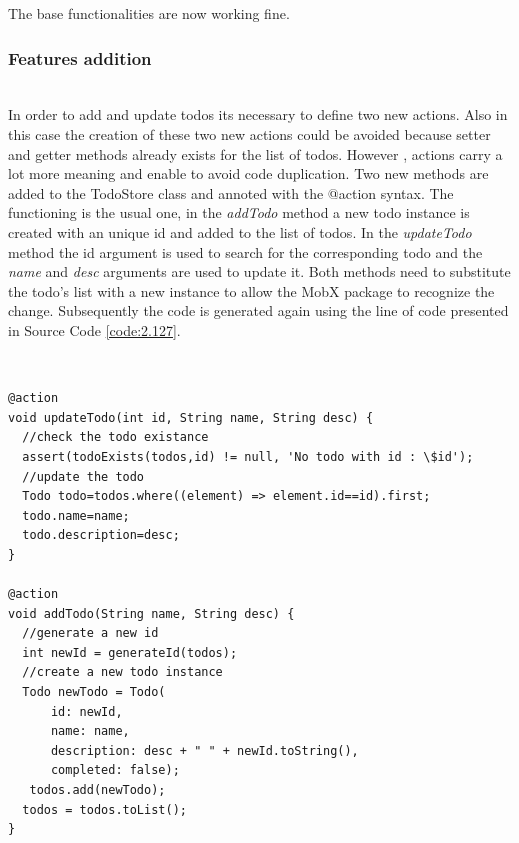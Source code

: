 The base functionalities are now working fine.
\subsubsection{Features addition} \mbox{}\\ \label{par:todo_app_inherited_widget_introduction}In order to add and update todos its necessary to define two new actions. Also in this case the creation of these two new actions could be avoided because setter and getter methods already exists for the list of todos. However , actions carry a lot more meaning and enable to avoid code duplication. Two new methods are added to the TodoStore class and annoted with the @action syntax. The functioning is the usual one, in the \textit{addTodo} method a new todo instance is created with an unique id and added to the list of todos. In the \textit{updateTodo} method the id argument is used to search for the corresponding todo and the \textit{name} and \textit{desc} arguments are used to update it. Both methods need to substitute the todo’s list with a new instance to allow the MobX package to recognize the change. Subsequently the code is generated again using the line of code presented in Source Code \ref{code:2.127}.
\begin{code}
\mbox{}\\
 \mbox{}
		\label{code:2.14}
\begin{verbatim}
@action
void updateTodo(int id, String name, String desc) {
  //check the todo existance
  assert(todoExists(todos,id) != null, 'No todo with id : \$id');
  //update the todo
  Todo todo=todos.where((element) => element.id==id).first;
  todo.name=name;
  todo.description=desc;
}
 
@action
void addTodo(String name, String desc) {
  //generate a new id
  int newId = generateId(todos);
  //create a new todo instance
  Todo newTodo = Todo(
      id: newId,
      name: name,
      description: desc + " " + newId.toString(),
      completed: false);
   todos.add(newTodo);
  todos = todos.toList();
}
\end{verbatim}
\mbox{}
\end{code}

